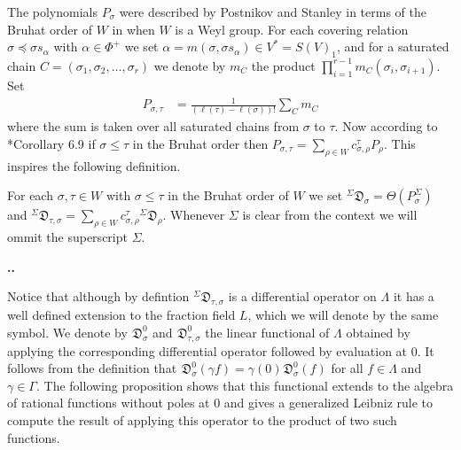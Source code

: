 \documentclass[11pt,fleqn]{amsart}
\renewcommand\thesection{\arabic{section}}
\newcounter{para}[section]
\renewcommand\thepara{\thesection.\arabic{para}}
\def\paragraph{%
 \noindent
 \refstepcounter{para}%
 \textbf{\thepara.}\hspace{1ex}%
}
\newcommand\D[3]{{}^{#1} \mathfrak D_{#2}^{#3}}
\begin{document}
The polynomials $P_\sigma$ were described by Postnikov and Stanley in terms of 
the Bruhat order of $W$ in \cite{PS-chains-bruhat} when $W$ is a Weyl 
group. For each covering relation $\sigma \preceq \sigma s_\alpha$ with 
$\alpha \in \Phi^+$ we set $\alpha = m(\sigma,\sigma s_\alpha) \in V^* = 
S(V)_1$, and for a saturated chain $C = (\sigma_1, \sigma_2, \ldots, 
\sigma_r)$ we denote by $m_C$ the product $\prod_{i=1}^{r-1} 
m_C(\sigma_i,\sigma_{i+1})$. Set
\begin{align*}
P_{\sigma, \tau} &= \frac{1}{(\ell(\tau) - \ell(\sigma))!}\sum_C m_C
\end{align*}
where the sum is taken over all saturated chains from $\sigma$ to $\tau$. 
Now according to \cite{PS-chains-bruhat}*{Corollary 6.9} if $\sigma \leq \tau$ 
in the Bruhat order then $P_{\sigma,\tau} = \sum_{\rho \in W} 
c^{\tau}_{\sigma,\rho} P_{\rho}$. This inspires the following definition.
\begin{Definition}
For each $\sigma, \tau \in W$ with $\sigma \leq \tau$ in the Bruhat order of 
$W$ we set $\D{\Sigma}{\sigma}{} = \Theta(P_\sigma^\Sigma)$ and 
$\D{\Sigma}{\tau,\sigma}{} = \sum_{\rho \in W} c^\tau_{\sigma, \rho} 
\D{\Sigma}{\rho}{}$. Whenever $\Sigma$ is clear from the context we will ommit 
the superscript $\Sigma$.
\end{Definition}

\paragraph
\label{P:leibniz-rule}
Notice that although by defintion $\D{\Sigma}{\tau, \sigma}{}$ is a 
differential operator on $\Lambda$ it has a well defined extension to the 
fraction field $L$, which we will denote by the same symbol. We denote by 
$\D{}{\sigma}{0}$ and $\D{}{\tau, \sigma}{0}$ the linear functional of 
$\Lambda$ obtained by applying the corresponding differential operator followed
by evaluation at $0$. It follows from the definition that $\D{}{\sigma}{0}
(\gamma f) = \gamma(0) \D{}{\sigma}{0}(f)$ for all $f \in \Lambda$ and 
$\gamma \in \Gamma$. The following proposition shows that this functional 
extends to the algebra of rational functions without poles at $0$ and gives a 
generalized Leibniz rule to compute the result of applying this operator to 
the product of two such functions. 
\end{document}
